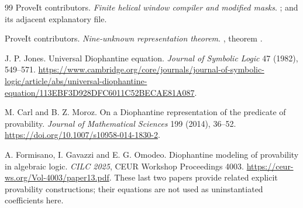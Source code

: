 \documentclass[11pt,a4paper]{article}
\theoremstyle{definition}\newtheorem{definition}[theorem]{Definition}
\newcommand{\file}[1]{\texttt{\detokenize{#1}}}
\begin{document}
\begin{thebibliography}{99}
ProveIt contributors. \emph{Finite helical window compiler and modified masks}.
;
and its adjacent explanatory \file{.md} file.

ProveIt contributors. \emph{Nine-unknown representation theorem}.
,
theorem \file{Jones1982.nine_unknowns}.

J. P. Jones. Universal Diophantine equation.
\emph{Journal of Symbolic Logic} 47 (1982), 549--571.
\url{https://www.cambridge.org/core/journals/journal-of-symbolic-logic/article/abs/universal-diophantine-equation/113EBF3D928DFC6011C52BECAE81A087}.

M. Carl and B. Z. Moroz. On a Diophantine representation of the predicate
of provability. \emph{Journal of Mathematical Sciences} 199 (2014), 36--52.
\url{https://doi.org/10.1007/s10958-014-1830-2}.

A. Formisano, I. Gavazzi and E. G. Omodeo.
Diophantine modeling of provability in algebraic logic.
\emph{CILC 2025}, CEUR Workshop Proceedings 4003.
\url{https://ceur-ws.org/Vol-4003/paper13.pdf}.
These last two papers provide related explicit provability constructions;
their equations are not used as uninstantiated coefficients here.
\end{thebibliography}
\end{document}
